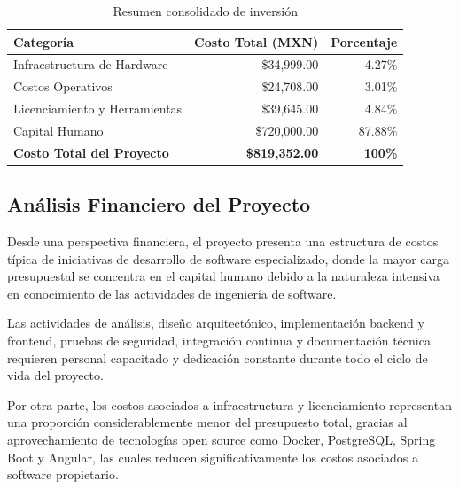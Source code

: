 \documentclass[12pt,oneside,letterpaper]{book}
\begin{document}
\begin{table}[H]
\centering
\caption{Resumen consolidado de inversión}

\begin{tabular}{lrr}
\toprule
\rowcolor{headerblue}
\textbf{Categoría} & \textbf{Costo Total (MXN)} & \textbf{Porcentaje} \\
\midrule

Infraestructura de Hardware &
\$34,999.00 &
4.27\% \\

Costos Operativos &
\$24,708.00 &
3.01\% \\

Licenciamiento y Herramientas &
\$39,645.00 &
4.84\% \\

Capital Humano &
\$720,000.00 &
87.88\% \\

\midrule
\textbf{Costo Total del Proyecto} &
\textbf{\$819,352.00} &
\textbf{100\%} \\

\bottomrule
\end{tabular}
\end{table}

\vspace{0.5cm}




\subsection{Análisis Financiero del Proyecto}

Desde una perspectiva financiera, el proyecto presenta una estructura de costos típica de iniciativas de desarrollo de software especializado, donde la mayor carga presupuestal se concentra en el capital humano debido a la naturaleza intensiva en conocimiento de las actividades de ingeniería de software.

Las actividades de análisis, diseño arquitectónico, implementación backend y frontend, pruebas de seguridad, integración continua y documentación técnica requieren personal capacitado y dedicación constante durante todo el ciclo de vida del proyecto.

Por otra parte, los costos asociados a infraestructura y licenciamiento representan una proporción considerablemente menor del presupuesto total, gracias al aprovechamiento de tecnologías open source como Docker, PostgreSQL, Spring Boot y Angular, las cuales reducen significativamente los costos asociados a software propietario.
\end{document}
